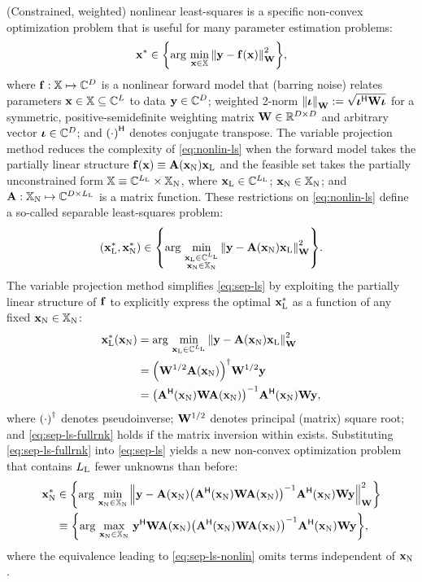 (Constrained, weighted) nonlinear least-squares
is a specific non-convex optimization problem 
that is useful for many parameter estimation problems:
\begin{align}
	\bmx^* \in \set{\argmin{\bmx\in\setX} \norm{\bmy - \bmfa{\bmx}}^2_{\bmW}},
	\label{eq:nonlin-ls}
\end{align}
where $\mathbf{f} : \mathbb{X} \mapsto \mathbb{C}^{D}$ is 
a nonlinear forward model
that (barring noise) 
relates parameters 
$\mathbf{x} \in \mathbb{X} \subseteq \mathbb{C}^{L}$ 
to data $\mathbf{y} \in \mathbb{C}^{D}$;
weighted 2-norm
$\norm{\bmiota}_\bmW := \sqrt{\bmiota\ctpose\bmW\bmiota}$
for a symmetric, positive-semidefinite weighting matrix
$\mathbf{W} \in \mathbb{R}^{D\times D}$ 
and arbitrary vector $\boldsymbol{\iota} \in \mathbb{C}^{D}$;
and $\paren{\cdot}\ctpose$ denotes conjugate transpose.
The variable projection method 
\cite{golub:03:snl}
reduces the complexity of \eqref{eq:nonlin-ls}
when the forward model takes
the partially linear structure
$\bmfa{\bmx} \equiv \bmAa{\bmxn}\bmxl$
and the feasible set takes 
the partially unconstrained form 
$\mathbb{X} \equiv \mathbb{C}^{L_\mathrm{L}} \times \mathbb{X}_\mathrm{N}$,
where $\mathbf{x}_\mathrm{L} \in \mathbb{C}^{L_\mathrm{L}}$; $\mathbf{x}_\mathrm{N} \in \mathbb{X}_\mathrm{N}$;
and $\mathbf{A} : \mathbb{X}_\mathrm{N} \mapsto \mathbb{C}^{D\times L_\mathrm{L}}$ 
is a matrix function.
These restrictions on \eqref{eq:nonlin-ls} 
define a so-called separable least-squares problem:
\begin{align}
	\paren{\bmxl^*,\bmxn^*} \in 
		\set{\argmin{\substack{\bmxl \in \complexes{\Ll} \\ \bmxn \in \setXn}} 
		\norm{\bmy - \bmAa{\bmxn}\bmxl}^2_{\bmW}}.
	\label{eq:sep-ls}
\end{align}
The variable projection method simplifies \eqref{eq:sep-ls}
by exploiting the partially linear structure of $\mathbf{f}$ 
to explicitly express the optimal $\mathbf{x}_\mathrm{L}^*$ as a function 
of any fixed $\mathbf{x}_\mathrm{N} \in \mathbb{X}_\mathrm{N}$:
\begin{align}
	\bmxl^*\paren{\bmxn} 
		&= \argmin{\bmxl \in \complexes{\Ll}} 
		\norm{\bmy - \bmAa{\bmxn}\bmxl}^2_{\bmW} 
		\nonumber \\
		&= \pinv{\bmW^{1/2}\bmAa{\bmxn}} \bmW^{1/2} \bmy
		\label{eq:sep-ls-lin} \\
		&= \inv{\bmA\ctpose\paren{\bmxn} \bmW \bmAa{\bmxn}} 
		\bmA\ctpose\paren{\bmxn} \bmW \bmy,
		\label{eq:sep-ls-fullrnk}
\end{align}
where $\pinv{\cdot}$ denotes pseudoinverse;
$\mathbf{W}^{1/2}$ denotes principal (matrix) square root;
and \eqref{eq:sep-ls-fullrnk} holds
if the matrix inversion within exists.
Substituting \eqref{eq:sep-ls-fullrnk}
into \eqref{eq:sep-ls} 
yields a new non-convex optimization problem
that contains $L_\mathrm{L}$ fewer unknowns than before:
\begin{align}
	\bmxn^* &\in \set{\argmin{\bmxn\in\setXn} 
	\norm{\bmy - \bmAa{\bmxn}\inv{\bmA\ctpose\paren{\bmxn} \bmW \bmAa{\bmxn}}
		\bmA\ctpose\paren{\bmxn} \bmW \bmy}^2_{\bmW}} 
		\nonumber \\
	&\equiv \set{\argmax{\bmxn\in\setXn}
		\bmy\ctpose \bmW \bmAa{\bmxn}
		\inv{\bmA\ctpose\paren{\bmxn} \bmW \bmAa{\bmxn}}
		\bmA\ctpose\paren{\bmxn} \bmW \bmy}, 
		\label{eq:sep-ls-nonlin}
\end{align}
where the equivalence leading to \eqref{eq:sep-ls-nonlin}
omits terms independent of $\mathbf{x}_\mathrm{N}$.


